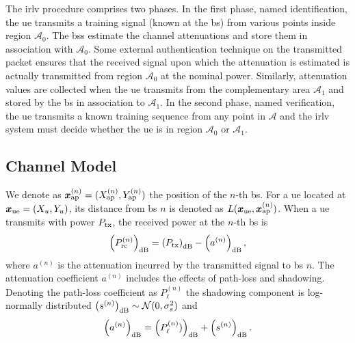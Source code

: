 \documentclass[conference]{IEEEtran}
\begin{document}
The \ac{irlv} procedure comprises two phases. In the first phase, named identification, the \ac{ue} transmits a training signal (known at the \acs{bs}) from various points inside region $\mathcal{A}_0$.  The \acp{bs} estimate the channel attenuations and store them in association with $\mathcal{A}_0$. Some external authentication technique on the transmitted packet  ensures that the received signal upon which the attenuation is estimated is actually transmitted from region $\mathcal{A}_0$ at the nominal power. Similarly, attenuation values are collected when the \ac{ue} transmits  from the complementary area $\mathcal{A}_1$ and  stored by the \ac{bs} in association to $\mathcal{A}_1$. In the second  phase, named verification, the \ac{ue} transmits a known training sequence from any point in $\mathcal{A}$ and the \ac{irlv} system must decide whether the \ac{ue} is in region $\mathcal{A}_0$ or $\mathcal{A}_1$.


\subsection{Channel Model}

We denote as $\bm{x}_{\rm ap}^{(n)} =(X_{\rm ap}^{(n)},Y_{\rm ap}^{(n)})$ the position of the $n$-th \ac{bs}. For a \ac{ue} located at $\bm{x}_{\rm ue}=(X_u,Y_u)$, its distance from \ac{bs} $n$ is denoted as $L(\bm{x}_{\rm ue},\bm{x}_{\rm ap}^{(n)})$. When a \ac{ue} transmits with power $P_{\rm tx}$, the received power at the $n$-th \ac{bs} is
\begin{equation}\label{eq: rec pow}
    \left(P_{\rm rc}^{(n)}\right)_{\rm dB}= \left(P_{\rm tx}\right)_{\rm dB} - \left(a^{(n)}\right)_{\rm dB},
\end{equation}
where $a^{(n)}$ is the attenuation incurred by the transmitted signal to \ac{bs} $n$. The attenuation coefficient $a^{(n)}$ includes the effects of path-loss and shadowing. Denoting the path-loss coefficient as $P_{\ell}^{(n)}$  the shadowing component is log-normally distributed $\left(s^{(n)}\right)_{\rm dB} \sim \mathcal{N}(0,\sigma_s^2)$ and
\begin{equation}
    \left(a^{(n)}\right)_{\rm dB} = \left(P_{\ell}^{(n)})\right)_{\rm dB} + \left(s^{(n)}\right)_{\rm dB}.
\end{equation}
\end{document}
